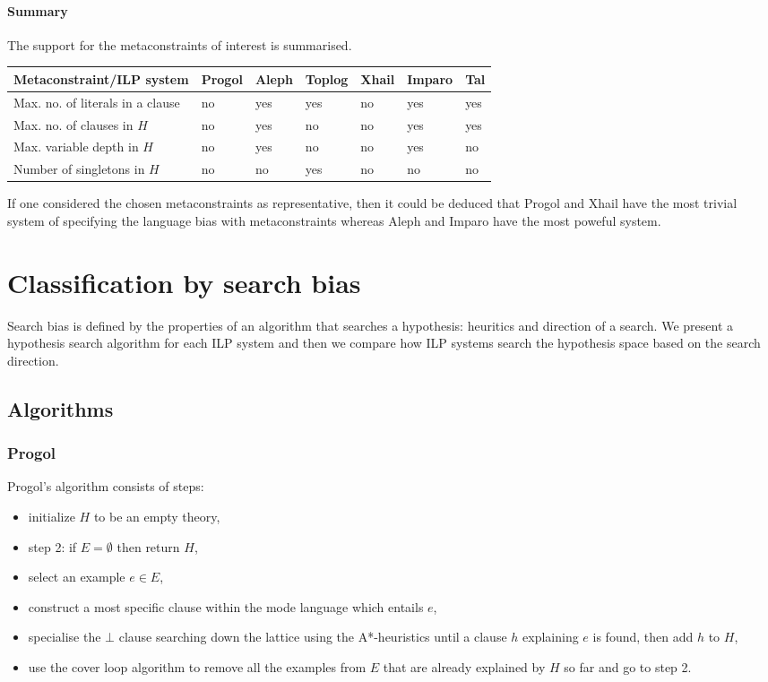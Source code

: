 \paragraph{Summary}
The support for the metaconstraints of interest is summarised.

 \label{tab:classification_by_metaconstraints} 
 \begin{tabular}{| l | l | l | l | l | l | l |}
    \hline
    Metaconstraint/ILP system & Progol & Aleph & Toplog & Xhail & Imparo & Tal \\ \hline
    Max. no. of literals in a clause & no & yes & yes & no & yes & yes\\ \hline
    Max. no. of clauses in $H$ & no & yes & no & no & yes & yes\\ \hline
    Max. variable depth in $H$ & no & yes & no & no & yes & no\\ \hline
    Number of singletons in $H$ & no & no & yes & no & no & no\\ \hline
  \end{tabular}
  
If one considered the chosen metaconstraints as representative, then it could be deduced that Progol and Xhail have the most trivial system of specifying the language bias with metaconstraints whereas Aleph and Imparo have the most poweful system.

\section{Classification by search bias}\label{classification_by_search_bias}
Search bias\cite{nienhuys1997foundations} is defined by the properties of an algorithm that searches a hypothesis: heuritics and direction of a search. We present a hypothesis search algorithm for each ILP system and then 
we compare how ILP systems search the hypothesis space based on the search direction.
\subsection{Algorithms}

\subsubsection{Progol\cite{muggleton1995inverse}\cite{kimber2012learning}}
Progol's algorithm consists of steps:
\begin{itemize}
\item initialize $H$ to be an empty theory,
\item step 2: if $E=\emptyset$ then return $H$,
\item select an example $e \in E$,
\item construct a most specific clause within the mode language which entails $e$,
\item specialise the $\bot$ clause searching down the lattice using the A*-heuristics until a clause $h$ explaining $e$ is found, then add $h$ to $H$,
\item use the cover loop algorithm to remove all the examples from $E$ that are already explained by $H$ so far and go to step 2.
\end{itemize}

